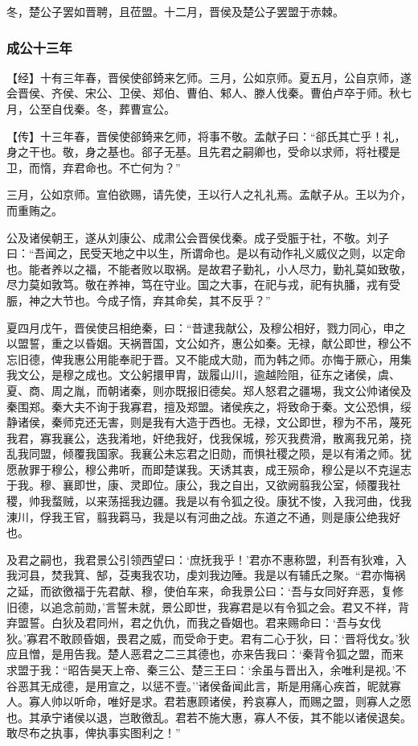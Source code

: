 \documentclass[]{article}
\begin{document}
冬，楚公子罢如晋聘，且莅盟。十二月，晋侯及楚公子罢盟于赤棘。

\hypertarget{header-n1692}{%
\subsubsection{成公十三年}\label{header-n1692}}

【经】十有三年春，晋侯使郤錡来乞师。三月，公如京师。夏五月，公自京师，遂会晋侯、齐侯、宋公、卫侯、郑伯、曹伯、邾人、滕人伐秦。曹伯卢卒于师。秋七月，公至自伐秦。冬，葬曹宣公。

【传】十三年春，晋侯使郤錡来乞师，将事不敬。孟献子曰：``郤氏其亡乎！礼，身之干也。敬，身之基也。郤子无基。且先君之嗣卿也，受命以求师，将社稷是卫，而惰，弃君命也。不亡何为？''

三月，公如京师。宣伯欲赐，请先使，王以行人之礼礼焉。孟献子从。王以为介，而重贿之。

公及诸侯朝王，遂从刘康公、成肃公会晋侯伐秦。成子受脤于社，不敬。刘子曰：``吾闻之，民受天地之中以生，所谓命也。是以有动作礼义威仪之则，以定命也。能者养以之福，不能者败以取祸。是故君子勤礼，小人尽力，勤礼莫如致敬，尽力莫如敦笃。敬在养神，笃在守业。国之大事，在祀与戎，祀有执膰，戎有受脤，神之大节也。今成子惰，弃其命矣，其不反乎？''

夏四月戊午，晋侯使吕相绝秦，曰：``昔逮我献公，及穆公相好，戮力同心，申之以盟誓，重之以昏姻。天祸晋国，文公如齐，惠公如秦。无禄，献公即世，穆公不忘旧德，俾我惠公用能奉祀于晋。又不能成大勋，而为韩之师。亦悔于厥心，用集我文公，是穆之成也。文公躬擐甲胄，跋履山川，逾越险阻，征东之诸侯，虞、夏、商、周之胤，而朝诸秦，则亦既报旧德矣。郑人怒君之疆埸，我文公帅诸侯及秦围郑。秦大夫不询于我寡君，擅及郑盟。诸侯疾之，将致命于秦。文公恐惧，绥静诸侯，秦师克还无害，则是我有大造于西也。无禄，文公即世，穆为不吊，蔑死我君，寡我襄公，迭我淆地，奸绝我好，伐我保城，殄灭我费滑，散离我兄弟，挠乱我同盟，倾覆我国家。我襄公未忘君之旧勋，而惧社稷之陨，是以有淆之师。犹愿赦罪于穆公，穆公弗听，而即楚谋我。天诱其衷，成王殒命，穆公是以不克逞志于我。穆、襄即世，康、灵即位。康公，我之自出，又欲阙翦我公室，倾覆我社稷，帅我蝥贼，以来荡摇我边疆。我是以有令狐之役。康犹不悛，入我河曲，伐我涷川，俘我王官，翦我羁马，我是以有河曲之战。东道之不通，则是康公绝我好也。

及君之嗣也，我君景公引领西望曰：`庶抚我乎！'君亦不惠称盟，利吾有狄难，入我河县，焚我箕、郜，芟夷我农功，虔刘我边陲。我是以有辅氏之聚。``君亦悔祸之延，而欲徼福于先君献、穆，使伯车来，命我景公曰：`吾与女同好弃恶，复修旧德，以追念前勋，'言誓未就，景公即世，我寡君是以有令狐之会。君又不祥，背弃盟誓。白狄及君同州，君之仇仇，而我之昏姻也。君来赐命曰：`吾与女伐狄。'寡君不敢顾昏姻，畏君之威，而受命于吏。君有二心于狄，曰：`晋将伐女。'狄应且憎，是用告我。楚人恶君之二三其德也，亦来告我曰：`秦背令狐之盟，而来求盟于我：``昭告昊天上帝、秦三公、楚三王曰：`余虽与晋出入，余唯利是视。'不谷恶其无成德，是用宣之，以惩不壹。''诸侯备闻此言，斯是用痛心疾首，昵就寡人。寡人帅以听命，唯好是求。君若惠顾诸侯，矜哀寡人，而赐之盟，则寡人之愿也。其承宁诸侯以退，岂敢徼乱。君若不施大惠，寡人不佞，其不能以诸侯退矣。敢尽布之执事，俾执事实图利之！''
\end{document}
